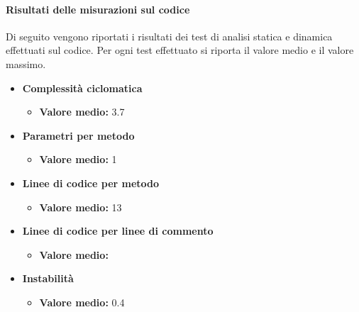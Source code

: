\paragraph{Risultati delle misurazioni sul codice}
Di seguito vengono riportati i risultati dei test di analisi statica e dinamica effettuati sul codice.
Per ogni test effettuato si riporta il valore medio e il valore massimo.
\begin{itemize}
\item{\textbf{Complessità ciclomatica}}
\begin{itemize}
\item{\textbf{Valore medio: }}3.7
\end{itemize}
\item{\textbf{Parametri per metodo}}
\begin{itemize}
\item{\textbf{Valore medio: }}1
\end{itemize}
\item{\textbf{Linee di codice per metodo}}
\begin{itemize}
\item{\textbf{Valore medio: }}13
\end{itemize}
\item{\textbf{Linee di codice per linee di commento}}
\begin{itemize}
\item{\textbf{Valore medio: }}
\end{itemize}
\item{\textbf{Instabilità}}
\begin{itemize}
\item{\textbf{Valore medio: }}0.4
\end{itemize}
\end{itemize}
